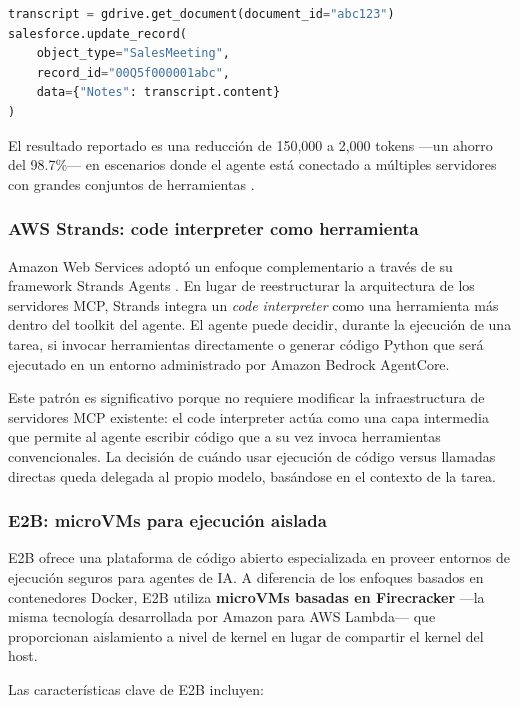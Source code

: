 \begin{lstlisting}[language=Python,caption={Orquestación directa mediante código}]
transcript = gdrive.get_document(document_id="abc123")
salesforce.update_record(
    object_type="SalesMeeting",
    record_id="00Q5f000001abc",
    data={"Notes": transcript.content}
)
\end{lstlisting}

El resultado reportado es una reducción de 150,000 a 2,000 tokens ---un ahorro
del 98.7\%--- en escenarios donde el agente está conectado a múltiples
servidores con grandes conjuntos de herramientas \citep{anthropic2024codeexec}.

\subsubsection{AWS Strands: code interpreter como herramienta}

Amazon Web Services adoptó un enfoque complementario a través de su framework
Strands Agents \citep{strands2025tools}. En lugar de reestructurar la
arquitectura de los servidores MCP, Strands integra un \textit{code
interpreter} como una herramienta más dentro del toolkit del agente. El agente
puede decidir, durante la ejecución de una tarea, si invocar herramientas
directamente o generar código Python que será ejecutado en un entorno
administrado por Amazon Bedrock AgentCore.

Este patrón es significativo porque no requiere modificar la infraestructura de
servidores MCP existente: el code interpreter actúa como una capa intermedia
que permite al agente escribir código que a su vez invoca herramientas
convencionales. La decisión de cuándo usar ejecución de código versus llamadas
directas queda delegada al propio modelo, basándose en el contexto de la tarea.

\subsubsection{E2B: microVMs para ejecución aislada}

E2B \citep{e2b2024sandbox} ofrece una plataforma de código abierto
especializada en proveer entornos de ejecución seguros para agentes de IA. A
diferencia de los enfoques basados en contenedores Docker, E2B utiliza
\textbf{microVMs basadas en Firecracker} ---la misma tecnología desarrollada
por Amazon para AWS Lambda--- que proporcionan aislamiento a nivel de kernel en
lugar de compartir el kernel del host.

Las características clave de E2B incluyen:

